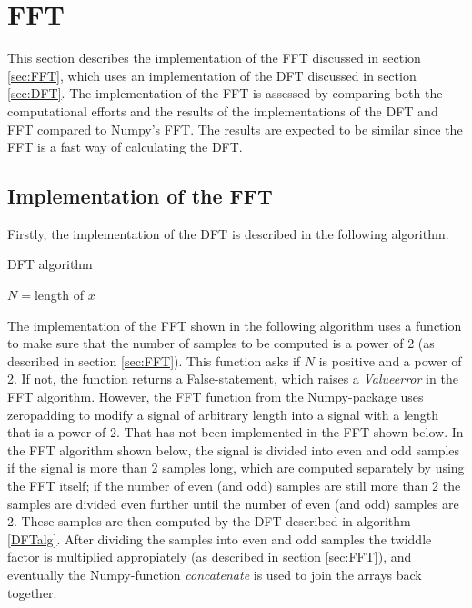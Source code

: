 \section{FFT}
This section describes the implementation of the FFT discussed in section \ref{sec:FFT}, which uses an implementation of the DFT discussed in section \ref{sec:DFT}. The implementation of the FFT is assessed by comparing both the computational efforts and the results of the implementations of the DFT and FFT compared to Numpy's FFT. The results are expected to be similar since the FFT is a fast way of calculating the DFT.

\subsection{Implementation of the FFT}
Firstly, the implementation of the DFT is described in the following algorithm.
\begin{algorithm}
\caption{DFT algorithm}
\label{DFTalg}
\begin{algorithmic}[1]
\State $N =$length of $x$ 
		 
		\EndFor
	\EndFor
\EndProcedure
\end{algorithmic}
\end{algorithm}

The implementation of the FFT shown in the following algorithm uses a function to make sure that the number of samples to be computed is a power of 2 (as described in section \ref{sec:FFT}). This function asks if $N$ is positive and a power of 2. If not, the function returns a False-statement, which raises a \textit{Valueerror} in the FFT algorithm. However, the FFT function from the Numpy-package uses zeropadding to modify a signal of arbitrary length into a signal with a length that is a power of 2. That has not been implemented in the FFT shown below. In the FFT algorithm shown below, the signal is divided into even and odd samples if the signal is more than 2 samples long, which are computed separately by using the FFT itself; if the number of even (and odd) samples are still more than 2 the samples are divided even further until the number of even (and odd) samples are 2. These samples are then computed by the DFT described in algorithm \ref{DFTalg}. After dividing the samples into even and odd samples the twiddle factor is multiplied appropiately (as described in section \ref{sec:FFT}), and eventually the Numpy-function \textit{concatenate} is used to join the arrays back together.

